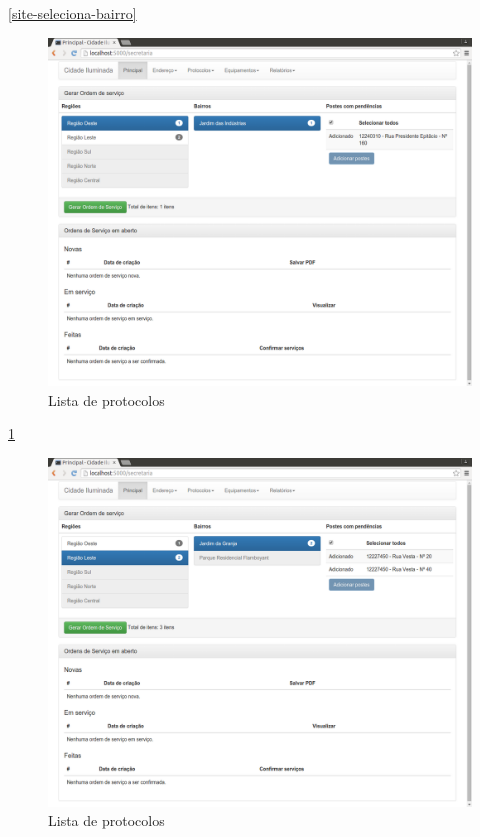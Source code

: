 \documentclass[
	article,			%
	11pt,				%
	oneside,			%
	a4paper,			%
	english,			%
	brazil,				%
	sumario=tradicional
	]{abntex2}
\begin{document}
\ref{site-seleciona-bairro}

\begin{figure}[!htbp]
 \centering
 \caption{\label{site-seleciona_poste}Lista de protocolos}
 \includegraphics[scale=0.25]{site/9-poste_selecionado.png}
\end{figure}

\ref{site-seleciona_poste}
\clearpage

\begin{figure}[!htbp]
 \centering
 \caption{\label{site-poste-selecionado}Lista de protocolos}
 \includegraphics[scale=0.25]{site/10-poste_selecionado-2.png}
\end{figure}
\end{document}
